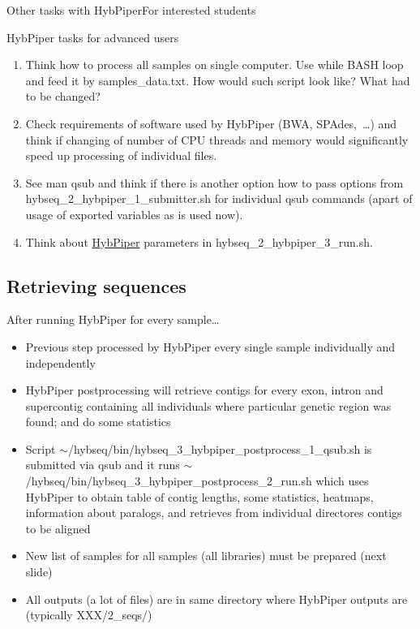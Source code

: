 \documentclass[compress,  xelatex, 11pt, xcolor=x11names, aspectratio=169,
	hyperref={
		bookmarks=true,
		unicode=true,
		colorlinks=true,
		pdftitle={HybSeq course},
		plainpages=false,
		pdfauthor={Vojtech Zeisek},
		pdfsubject={Practical processing of HybSeq target enrichment sequencing data on computing grids like MetaCentrum},
		pdfcreator={XeLaTeX},
		pdfkeywords={BASH, command line, GNU, HybSeq, Linux, MetaCentrum, sequencing shell, target enrichment},
		linkcolor=Turquoise4, %
		anchorcolor=DodgerBlue4, %
		citecolor=DodgerBlue4, %
		filecolor=DodgerBlue4, %
		menucolor=Tan4, %
		urlcolor=DarkOliveGreen4 %
		},
	url={hyphens, lowtilde} %
	]{beamer}
\renewcommand{\texttt}[1]{\colorbox{Cornsilk2}{{\ttfamily #1}}}
\begin{document}
\begin{frame}{Other tasks with HybPiper}{For interested students}
	\begin{exampleblock}{HybPiper tasks for advanced users}
		\begin{enumerate}
			\item Think how to process all samples on single computer. Use \texttt{while} BASH loop and feed it by \texttt{samples\_data.txt}. How would such script look like? What had to be changed?
			\item Check requirements of software used by HybPiper (BWA, SPAdes,~\ldots) and think if changing of number of CPU threads and memory would significantly speed up processing of individual files.
			\item See \texttt{man qsub} and think if there is another option how to pass options from \texttt{hybseq\_2\_hybpiper\_1\_submitter.sh} for individual \texttt{qsub} commands (apart of usage of exported variables as is used now).
			\item Think about \href{https://github.com/mossmatters/HybPiper/wiki}{HybPiper} parameters in \texttt{hybseq\_2\_hybpiper\_3\_run.sh}.
		\end{enumerate}
	\end{exampleblock}
\end{frame}

\subsection{Retrieving sequences}

\begin{frame}{After running HybPiper for every sample\ldots}
	\begin{itemize}
		\item Previous step processed by HybPiper every single sample individually and independently
		\item HybPiper postprocessing will retrieve contigs for every exon, intron and supercontig containing all individuals where particular genetic region was found; and do some statistics
		\item Script \texttt{$\sim$/hybseq/bin/hybseq\_3\_hybpiper\_postprocess\_1\_qsub.sh} is submitted via \texttt{qsub} and it runs \texttt{$\sim$/hybseq/bin/hybseq\_3\_hybpiper\_postprocess\_2\_run.sh} which uses HybPiper to obtain table of contig lengths, some statistics, heatmaps, information about paralogs, and retrieves from individual directores contigs to be aligned
		\item New list of samples for all samples (all libraries) must be prepared (next slide)
		\item All outputs (a lot of files) are in same directory where HybPiper outputs are (typically \texttt{XXX/2\_seqs/})
	\end{itemize}
\end{frame}
\end{document}
